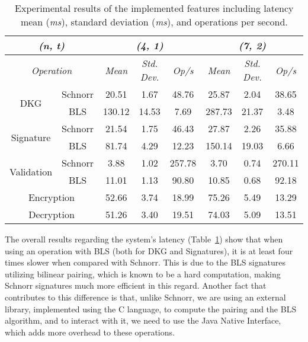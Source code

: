 \setlength{\tabcolsep}{6pt}
\renewcommand{\arraystretch}{1.25}
\begin{table}[]
\caption{Experimental results of the implemented features including latency mean (\textit{ms}), standard deviation (\textit{ms}), and operations per second.}
\label{tab:latency-results}
\centering
\begin{tabular}{|cc|ccc|ccc|}
\hline
\multicolumn{2}{|c|}{\textit{(n, t)}} & \multicolumn{3}{c|}{\textit{(4, 1)}} & \multicolumn{3}{c|}{\textit{(7, 2)}} \\ \hline
\multicolumn{2}{|c|}{\textit{Operation}} & \multicolumn{1}{c|}{\textit{Mean}} & \multicolumn{1}{c|}{\textit{Std. Dev.}} & \textit{Op/s} & \multicolumn{1}{c|}{\textit{Mean}} & \multicolumn{1}{c|}{\textit{Std. Dev.}} & \textit{Op/s} \\ [0.5ex] \hline \hline
\multicolumn{1}{|c|}{\multirow{2}{*}{DKG}} & Schnorr & 20.51 & 1.67 & 48.76 & 25.87 & 2.04 & 38.65 \\ \cline{2-2}
\multicolumn{1}{|c|}{} & BLS & 130.12 & 14.53 & 7.69 & 287.73 & 21.37 & 3.48 \\ \hline
\multicolumn{1}{|c|}{\multirow{2}{*}{Signature}} & Schnorr & 21.54 & 1.75 & 46.43 & 27.87 & 2.26 & 35.88 \\ \cline{2-2}
\multicolumn{1}{|c|}{} & BLS & 81.74 & 4.29 & 12.23 & 150.14 & 19.03 & 6.66 \\ \hline
\multicolumn{1}{|c|}{\multirow{2}{*}{Validation}} & Schnorr & 3.88 & 1.02 & 257.78 & 3.70 & 0.74 & 270.11 \\ \cline{2-2}
\multicolumn{1}{|c|}{} & BLS & 11.01 & 1.13 & 90.80 & 10.85 & 0.68 & 92.18 \\ \hline
\multicolumn{2}{|c|}{Encryption} & 52.66 & 3.74 & 18.99 & 75.26 & 5.49 & 13.29 \\ \hline
\multicolumn{2}{|c|}{Decryption} & 51.26 & 3.40 & 19.51 & 74.03 & 5.09 & 13.51 \\ \hline
\end{tabular}
\end{table}


The overall results regarding the system's latency (Table~\ref{tab:latency-results}) show that when using an operation with BLS (both for DKG and Signatures), it is at least four times slower when compared with Schnorr. This is due to the BLS signatures utilizing bilinear pairing, which is known to be a hard computation, making Schnorr signatures much more efficient in this regard. Another fact that contributes to this difference is that, unlike Schnorr, we are using an external library, implemented using the C language, to compute the pairing and the BLS algorithm, and to interact with it, we need to use the Java Native Interface, which adds more overhead to these operations.

